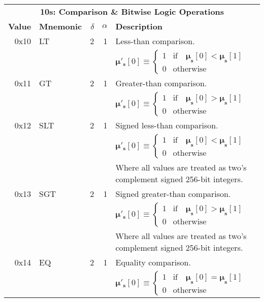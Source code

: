 \documentclass[9pt,oneside]{amsart}
\begin{document}
\begin{tabular*}{\columnwidth}[h]{rlrrl}
\toprule
\multicolumn{5}{c}{\textbf{10s: Comparison \& Bitwise Logic Operations}} \\
\textbf{Value} & \textbf{Mnemonic} & $\delta$ & $\alpha$ & \textbf{Description} \vspace{5pt} \\
0x10 & {\small LT} & 2 & 1 & Less-than comparison. \\
&&&& $\boldsymbol{\mu}'_\mathbf{s}[0] \equiv \begin{cases} 1 & \text{if} \quad \boldsymbol{\mu}_\mathbf{s}[0] < \boldsymbol{\mu}_\mathbf{s}[1] \\ 0 & \text{otherwise} \end{cases}$ \\
\midrule
0x11 & {\small GT} & 2 & 1 & Greater-than comparison. \\
&&&& $\boldsymbol{\mu}'_\mathbf{s}[0] \equiv \begin{cases} 1 & \text{if} \quad \boldsymbol{\mu}_\mathbf{s}[0] > \boldsymbol{\mu}_\mathbf{s}[1] \\ 0 & \text{otherwise} \end{cases}$ \\
\midrule
0x12 & {\small SLT} & 2 & 1 & Signed less-than comparison. \\
&&&& $\boldsymbol{\mu}'_\mathbf{s}[0] \equiv \begin{cases} 1 & \text{if} \quad \boldsymbol{\mu}_\mathbf{s}[0] < \boldsymbol{\mu}_\mathbf{s}[1] \\ 0 & \text{otherwise} \end{cases}$ \\
&&&& Where all values are treated as two's complement signed 256-bit integers. \\
\midrule
0x13 & {\small SGT} & 2 & 1 & Signed greater-than comparison. \\
&&&& $\boldsymbol{\mu}'_\mathbf{s}[0] \equiv \begin{cases} 1 & \text{if} \quad \boldsymbol{\mu}_\mathbf{s}[0] > \boldsymbol{\mu}_\mathbf{s}[1] \\ 0 & \text{otherwise} \end{cases}$ \\
&&&& Where all values are treated as two's complement signed 256-bit integers. \\
\midrule
0x14 & {\small EQ} & 2 & 1 & Equality comparison. \\
&&&& $\boldsymbol{\mu}'_\mathbf{s}[0] \equiv \begin{cases} 1 & \text{if} \quad \boldsymbol{\mu}_\mathbf{s}[0] = \boldsymbol{\mu}_\mathbf{s}[1] \\ 0 & \text{otherwise} \end{cases}$ \\

\end{tabular*}
\end{document}
